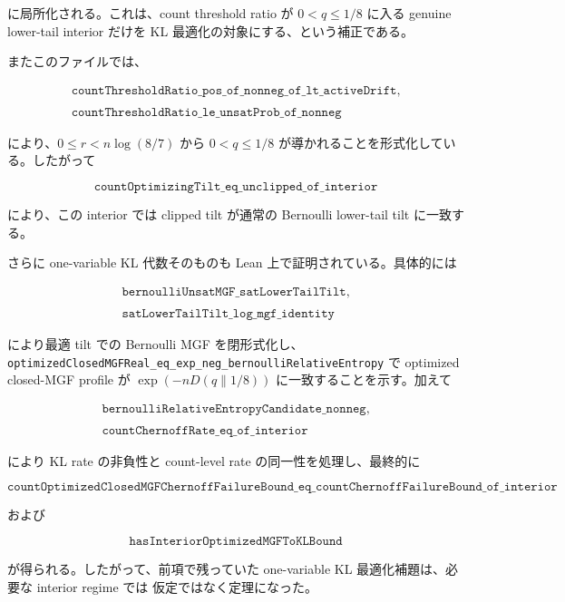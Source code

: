 \documentclass[12pt,a4paper]{article}
\begin{document}
に局所化される。これは、count threshold ratio が \(0<q\le1/8\) に入る genuine lower-tail interior だけを KL 最適化の対象にする、という補正である。

またこのファイルでは、

\[
\begin{aligned}
\texttt{countThresholdRatio\_pos\_of\_nonneg\_of\_lt\_activeDrift}, \\
\qquad \\
\texttt{countThresholdRatio\_le\_unsatProb\_of\_nonneg}
\end{aligned}
\]

により、\(0\le r<n\log(8/7)\) から \(0<q\le1/8\) が導かれることを形式化している。したがって

\[
\texttt{countOptimizingTilt\_eq\_unclipped\_of\_interior}
\]

により、この interior では clipped tilt が通常の Bernoulli lower-tail tilt に一致する。

さらに one-variable KL 代数そのものも Lean 上で証明されている。具体的には

\[
\begin{aligned}
\texttt{bernoulliUnsatMGF\_satLowerTailTilt}, \\
\qquad \\
\texttt{satLowerTailTilt\_log\_mgf\_identity}
\end{aligned}
\]

により最適 tilt での Bernoulli MGF を閉形式化し、 \texttt{optimizedClosedMGFReal\_eq\_exp\_neg\_bernoulliRelativeEntropy} で optimized closed-MGF profile が \(\exp(-nD(q\|1/8))\) に一致することを示す。加えて

\[
\begin{aligned}
\texttt{bernoulliRelativeEntropyCandidate\_nonneg}, \\
\qquad \\
\texttt{countChernoffRate\_eq\_of\_interior}
\end{aligned}
\]

により KL rate の非負性と count-level rate の同一性を処理し、最終的に

\[
\texttt{countOptimizedClosedMGFChernoffFailureBound\_eq\_countChernoffFailureBound\_of\_interior}
\]

および

\[
\texttt{hasInteriorOptimizedMGFToKLBound}
\]

が得られる。したがって、前項で残っていた one-variable KL 最適化補題は、必要な interior regime では 仮定ではなく定理になった。
\end{document}
